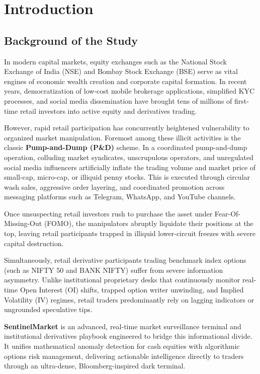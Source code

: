 \chapter{Introduction}

\section{Background of the Study}
In modern capital markets, equity exchanges such as the National Stock Exchange of India (NSE) and Bombay Stock Exchange (BSE) serve as vital engines of economic wealth creation and corporate capital formation. In recent years, democratization of low-cost mobile brokerage applications, simplified KYC processes, and social media dissemination have brought tens of millions of first-time retail investors into active equity and derivatives trading.

However, rapid retail participation has concurrently heightened vulnerability to organized market manipulation. Foremost among these illicit activities is the classic \textbf{Pump-and-Dump (P\&D)} scheme. In a coordinated pump-and-dump operation, colluding market syndicates, unscrupulous operators, and unregulated social media influencers artificially inflate the trading volume and market price of small-cap, micro-cap, or illiquid penny stocks. This is executed through circular wash sales, aggressive order layering, and coordinated promotion across messaging platforms such as Telegram, WhatsApp, and YouTube channels. 

Once unsuspecting retail investors rush to purchase the asset under Fear-Of-Missing-Out (FOMO), the manipulators abruptly liquidate their positions at the top, leaving retail participants trapped in illiquid lower-circuit freezes with severe capital destruction.

Simultaneously, retail derivative participants trading benchmark index options (such as NIFTY 50 and BANK NIFTY) suffer from severe information asymmetry. Unlike institutional proprietary desks that continuously monitor real-time Open Interest (OI) shifts, trapped option writer unwinding, and Implied Volatility (IV) regimes, retail traders predominantly rely on lagging indicators or ungrounded speculative tips. 

\textbf{SentinelMarket} is an advanced, real-time market surveillance terminal and institutional derivatives playbook engineered to bridge this informational divide. It unifies mathematical anomaly detection for cash equities with algorithmic options risk management, delivering actionable intelligence directly to traders through an ultra-dense, Bloomberg-inspired dark terminal.

